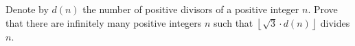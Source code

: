 Denote by $d(n)$ the number of positive divisors of a positive integer $n$.
Prove that there are infinitely many positive integers $n$ such that $\left\lfloor\sqrt{3}\cdot d(n)\right\rfloor$ divides $n$.